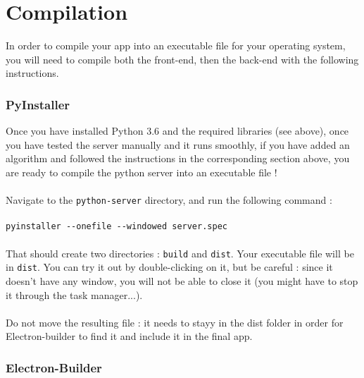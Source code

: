 \documentclass[12pt,a4paper]{article}
\begin{document}
\pagebreak

\part{Compilation}
\setcounter{section}{0}

In order to compile your app into an executable file for your operating system, you will need to compile both the front-end, then the back-end with the following instructions.

\section{PyInstaller}

Once you have installed Python 3.6 and the required libraries (see above), once you have tested the server manually and it runs smoothly, if you have added an algorithm and followed the instructions in the corresponding section above, you are ready to compile the python server into an executable file !\\
~\\
Navigate to the \texttt{python-server} directory, and run the following command :\\
~\\
\texttt{pyinstaller -{}-onefile -{}-windowed server.spec}\\
~\\
That should create two directories : \texttt{build} and \texttt{dist}. Your executable file will be in \texttt{dist}. You can try it out by double-clicking on it, but be careful : since it doesn't have any window, you will not be able to close it (you might have to stop it through the task manager...).\\
~\\
Do not move the resulting file : it needs to stayy in the dist folder in order for Electron-builder to find it and include it in the final app.

\section{Electron-Builder}
\end{document}
